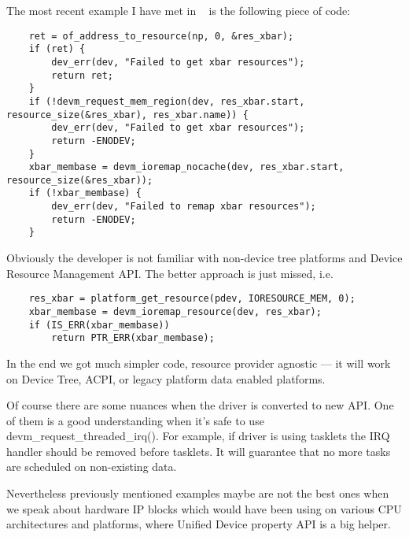 \documentclass[10pt, a5paper]{article}
\begin{document}
The most recent example I have met in ~\cite{Shevchenko5} is the following piece of code:

\lstset{ %
language=C,                 %
basicstyle=\small\sffamily, %
breaklines=true,           %
breakatwhitespace=false, %
}
\begin{lstlisting}
    ret = of_address_to_resource(np, 0, &res_xbar);
    if (ret) {
        dev_err(dev, "Failed to get xbar resources");
        return ret;
    }
    if (!devm_request_mem_region(dev, res_xbar.start, resource_size(&res_xbar), res_xbar.name)) {
        dev_err(dev, "Failed to get xbar resources");
        return -ENODEV;
    }
    xbar_membase = devm_ioremap_nocache(dev, res_xbar.start, resource_size(&res_xbar));
    if (!xbar_membase) {
        dev_err(dev, "Failed to remap xbar resources");
        return -ENODEV;
    }
\end{lstlisting}

Obviously the developer is not familiar with non-device tree platforms and Device Resource Management API. The better approach is just missed, i.e.

\lstset{ %
language=C,                 %
basicstyle=\small\sffamily, %
breaklines=true,           %
breakatwhitespace=false, %
}
\begin{lstlisting}
    res_xbar = platform_get_resource(pdev, IORESOURCE_MEM, 0);
    xbar_membase = devm_ioremap_resource(dev, res_xbar);
    if (IS_ERR(xbar_membase))
        return PTR_ERR(xbar_membase);
\end{lstlisting}

In the end we got much simpler code, resource provider agnostic — it will work on Device Tree, ACPI, or legacy platform data enabled platforms.

Of course there are some nuances when the driver is converted to new API. One of them is a good understanding when it’s safe to use devm\_request\_threaded\_irq(). For example, if driver is using tasklets the IRQ handler should be removed before tasklets. It will guarantee that no more tasks are scheduled on non-existing data.

Nevertheless previously mentioned examples maybe are not the best ones when we speak about hardware IP blocks which would have been using on various CPU architectures and platforms, where Unified Device property API is a big helper.
\end{document}
